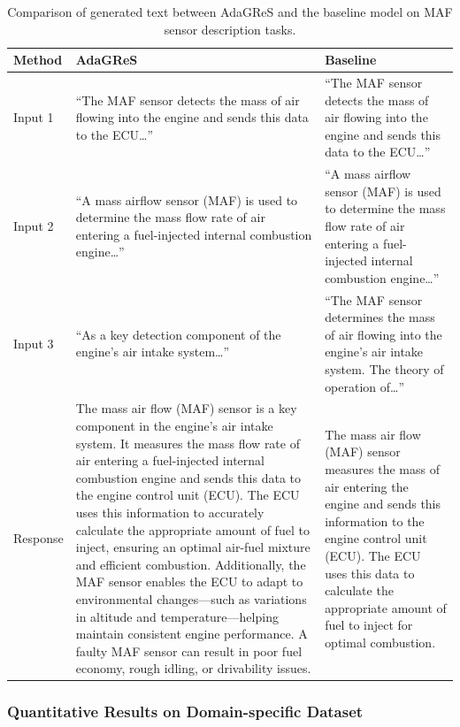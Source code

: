 \documentclass[11pt]{article}
\begin{document}
\begin{table}[t]
  \centering
  \begin{tabular}{p{2cm}p{6.5cm}p{6.5cm}}
    \hline
    \textbf{Method} & \textbf{AdaGReS} & \textbf{Baseline} \\
    \hline
    Input 1 & 
    ``The MAF sensor detects the mass of air flowing into the engine and sends this data to the ECU\ldots'' &
    ``The MAF sensor detects the mass of air flowing into the engine and sends this data to the ECU\ldots'' \\
    
    Input 2 & 
    ``A mass airflow sensor (MAF) is used to determine the mass flow rate of air entering a fuel-injected internal combustion engine\ldots'' &
    ``A mass airflow sensor (MAF) is used to determine the mass flow rate of air entering a fuel-injected internal combustion engine\ldots'' \\
    
    Input 3 & 
    ``As a key detection component of the engine's air intake system\ldots'' &
    ``The MAF sensor determines the mass of air flowing into the engine's air intake system. The theory of operation of\ldots'' \\
    
    Response & 
    The mass air flow (MAF) sensor is a key component in the engine’s air intake system. It measures the mass flow rate of air entering a fuel-injected internal combustion engine and sends this data to the engine control unit (ECU). The ECU uses this information to accurately calculate the appropriate amount of fuel to inject, ensuring an optimal air-fuel mixture and efficient combustion. Additionally, the MAF sensor enables the ECU to adapt to environmental changes—such as variations in altitude and temperature—helping maintain consistent engine performance. A faulty MAF sensor can result in poor fuel economy, rough idling, or drivability issues. &
    The mass air flow (MAF) sensor measures the mass of air entering the engine and sends this information to the engine control unit (ECU). The ECU uses this data to calculate the appropriate amount of fuel to inject for optimal combustion. \\
    \hline
  \end{tabular}
  \caption{\label{tab:generation-comparison}
    Comparison of generated text between AdaGReS and the baseline model on MAF sensor description tasks.
  }
\end{table}

\subsubsection{Quantitative Results on Domain-specific Dataset}
\end{document}
